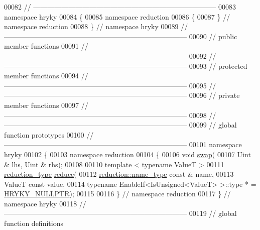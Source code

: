 \begin{DoxyCode}
00082 \textcolor{comment}{//
      ------------------------------------------------------------------------------}
00083 \textcolor{keyword}{namespace }hryky
00084 \{
00085 \textcolor{keyword}{namespace }reduction
00086 \{
00087 \} \textcolor{comment}{// namespace reduction}
00088 \} \textcolor{comment}{// namespace hryky}
00089 \textcolor{comment}{//
      ------------------------------------------------------------------------------}
00090 \textcolor{comment}{// public member functions}
00091 \textcolor{comment}{//
      ------------------------------------------------------------------------------}
00092 \textcolor{comment}{//
      ------------------------------------------------------------------------------}
00093 \textcolor{comment}{// protected member functions}
00094 \textcolor{comment}{//
      ------------------------------------------------------------------------------}
00095 \textcolor{comment}{//
      ------------------------------------------------------------------------------}
00096 \textcolor{comment}{// private member functions}
00097 \textcolor{comment}{//
      ------------------------------------------------------------------------------}
00098 \textcolor{comment}{//
      ------------------------------------------------------------------------------}
00099 \textcolor{comment}{// global function prototypes}
00100 \textcolor{comment}{//
      ------------------------------------------------------------------------------}
00101 \textcolor{keyword}{namespace }hryky
00102 \{
00103 \textcolor{keyword}{namespace }reduction
00104 \{
00106     \textcolor{keywordtype}{void} \hyperlink{namespacehryky_1_1reduction_a493c83efdf5f9e9c49ba77e1b65325a1}{swap}(
00107         Uint & lhs, Uint & rhs);
00108     
00110     \textcolor{keyword}{template} < \textcolor{keyword}{typename} ValueT >
00111     \hyperlink{namespacehryky_a343a9a4c36a586be5c2693156200eadc}{reduction_type} \hyperlink{namespacehryky_1_1reduction_a064022926c530d18aeb1b2abdf71800b}{reduce}(
00112         \hyperlink{namespacehryky_1_1reduction_ac686c30a4c8d196bbd0f05629a6b921f}{reduction::name_type} \textcolor{keyword}{const} & name,
00113         ValueT \textcolor{keyword}{const} value,
00114         \textcolor{keyword}{typename} EnableIf<IsUnsigned<ValueT> >::type * = \hyperlink{common_8h_a4cd4ac09cfcdbd6b30ee69afc156e210}{HRYKY_NULLPTR});
00115 
00116 \} \textcolor{comment}{// namespace reduction}
00117 \} \textcolor{comment}{// namespace hryky}
00118 \textcolor{comment}{//
      ------------------------------------------------------------------------------}
00119 \textcolor{comment}{// global function definitions}

\end{DoxyCode}
